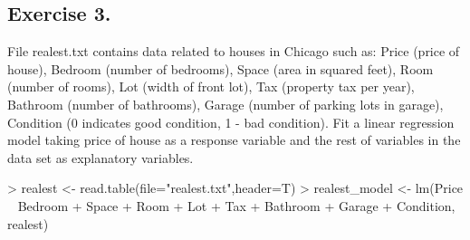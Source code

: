 \documentclass[a4paper]{article}
\begin{document}
\subsection{Exercise 3.} File realest.txt contains data related to houses in Chicago such as: Price (price of house), Bedroom (number of bedrooms), Space (area in squared feet), Room (number of rooms), Lot (width of front lot), Tax (property tax per year), Bathroom (number of bathrooms), Garage (number of parking lots in garage), Condition (0 indicates good condition, 1 - bad condition).
Fit a linear regression model taking price of house as a response variable and the rest of variables in the data set as explanatory variables.
\begin{Schunk}
\begin{Sinput}
> realest <- read.table(file="realest.txt",header=T)
> realest_model <- lm(Price ~ Bedroom + Space + Room + Lot + Tax + Bathroom + Garage + Condition, realest)
\end{Sinput}
\end{Schunk}
\end{document}
